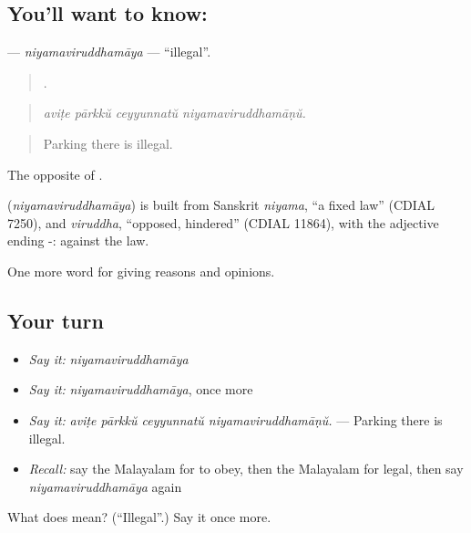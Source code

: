 \subsection*{You'll want to know: }
\textbf{} — \emph{niyamaviruddhamāya} — \textquotedblleft{}illegal\textquotedblright{}.

\begin{quote}
   .
\end{quote}

\begin{quote}
\emph{aviṭe pārkkŭ ceyyunnatŭ niyamaviruddhamāṇŭ.}
\end{quote}

\begin{quote}
Parking there is illegal.
\end{quote}

The opposite of .

\begin{cousinweb}
\textbf{} (\emph{niyamaviruddhamāya}) is built from Sanskrit \emph{niyama}, \textquotedblleft{}a fixed law\textquotedblright{} (CDIAL 7250), and \emph{viruddha}, \textquotedblleft{}opposed, hindered\textquotedblright{} (CDIAL 11864), with the adjective ending -: against the law.
\end{cousinweb}

\begin{grammarlens}[title={What you've built}]
One more word for giving reasons and opinions.
\end{grammarlens}

\subsection*{Your turn}
\begin{itemize}
\raggedright
  \item \emph{Say it:} \emph{niyamaviruddhamāya}
  \item \emph{Say it:} \emph{niyamaviruddhamāya}, once more
  \item \emph{Say it:} \emph{aviṭe pārkkŭ ceyyunnatŭ niyamaviruddhamāṇŭ.} — Parking there is illegal.
  \item \emph{Recall:} say the Malayalam for to obey, then the Malayalam for legal, then say \emph{niyamaviruddhamāya} again
\end{itemize}

\begin{tcolorbox}[breakable,colback=teal!4,colframe=teal!35!black,title={Before you move on}]
What does  mean? (\textquotedblleft{}Illegal\textquotedblright{}.) Say it once more.
\end{tcolorbox}
